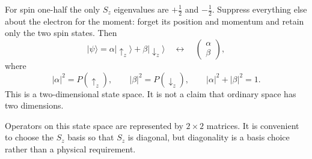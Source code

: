 For spin one-half the only \(S_z\) eigenvalues are \(+\tfrac12\) and \(-\tfrac12\). Suppress everything else about the electron for the moment: forget its position and momentum and retain only the two spin states. Then
\begin{equation}
|\psi\rangle
=
\alpha|\uparrow_z\rangle+\beta|\downarrow_z\rangle
\quad\longleftrightarrow\quad
\begin{pmatrix}
\alpha\\
\beta
\end{pmatrix},
\end{equation}
where
\begin{equation}
|\alpha|^2=P(\uparrow_z),
\qquad
|\beta|^2=P(\downarrow_z),
\qquad
|\alpha|^2+|\beta|^2=1.
\end{equation}
This is a two-dimensional state space. It is not a claim that ordinary space has two dimensions.

\begin{classroomqa}
\end{classroomqa}

Operators on this state space are represented by \(2\times2\) matrices. It is convenient to choose the \(S_z\) basis so that \(S_z\) is diagonal, but diagonality is a basis choice rather than a physical requirement.

\begin{classroomqa}
\end{classroomqa}

\begin{classroomqa}
\end{classroomqa}

